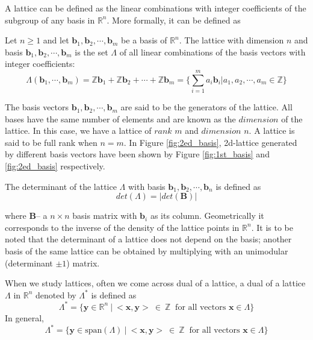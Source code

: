 A lattice can be defined as the linear combinations with integer coefficients of the subgroup of any basis in $\mathbb{R}^n$.
More formally, it can be defined as
\begin{definition}
  Let $n\geq 1$ and let $\pmb{b}_1, \pmb{b}_2, \cdots, \pmb{b}_m$ be a basis of $\mathbb{R}^n$.
    The lattice with dimension $n$ and basis $\pmb{b}_1,\pmb{b}_2, \cdots, \pmb{b}_m$ is the set $\Lambda$ of all linear combinations of the basis vectors with integer coefficients:
    \begin{equation*}
        \Lambda(\pmb{b}_1,\cdots,\pmb{b}_m)=\mathbb{Z}\pmb{b}_1+\mathbb{Z}\pmb{b}_2+ \cdots + \mathbb{Z}\pmb{b}_m = \Big\{ \sum_{i=1}^{m} a_i\pmb{b}_i | a_1,a_2,\cdots,a_m \in \mathbb{Z} \Big\}
    \end{equation*}
\end{definition}
The basis vectors $\boldsymbol{b}_{1} ,\boldsymbol{b}_{2}, \cdots ,\boldsymbol{b}_{m}$ are said to be the generators of the lattice.
All bases have the same number of elements and are known as the $dimension$ of the lattice.
In this case, we have a lattice of $rank$ $m$ and $dimension$ $n$.
A lattice is said to be full rank when $n=m$.
In Figure \ref{fig:2ed_basis}, 2d-lattice generated by different basis vectors have been shown by Figure \ref{fig:1st_basis} and \ref{fig:2ed_basis} respectively.

The determinant of the lattice $\Lambda$ with basis $\pmb{b}_1, \pmb{b}_2, \cdots, \pmb{b}_n$ is defined as
\begin{equation*}
    det(\Lambda)=|det(\pmb{B})|
\end{equation*}

where $\pmb{B}$-- a $n\times n$ basis matrix with $\pmb{b}_i$ as its column.
Geometrically it corresponds to the inverse of the density of the lattice points in $\mathbb{R}^n$.
It is to be noted that the determinant of a lattice does not depend on the basis; another basis of the same lattice can be obtained by multiplying with an unimodular (determinant $\pm1$) matrix.


When we study lattices, often we come across dual of a lattice, a dual of a lattice $\Lambda$ in $\mathbb{R}^n$ denoted by $\Lambda^{*}$ is defined as %
\begin{equation*}
    \Lambda^{*} =\{ \pmb{y} \in \mathbb{R}^n \ |\ <\pmb{x}, \pmb{y}> \ \in\ \mathbb{Z} \ \text{ for all vectors } \pmb{x} \in \Lambda \}
\end{equation*}
In general,
\begin{equation*}
    \Lambda^{*} =\{ \pmb{y} \in \text{span}(\Lambda) \ |\ <\pmb{x}, \pmb{y}> \ \in\ \mathbb{Z} \ \text{ for all vectors } \pmb{x} \in \Lambda \}
\end{equation*}

